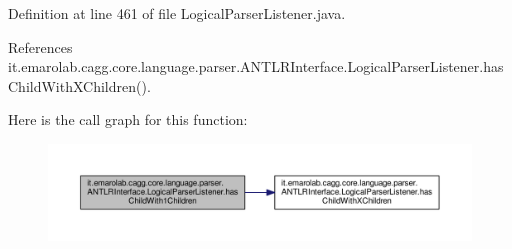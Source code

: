 Definition at line 461 of file Logical\-Parser\-Listener.\-java.



References it.\-emarolab.\-cagg.\-core.\-language.\-parser.\-A\-N\-T\-L\-R\-Interface.\-Logical\-Parser\-Listener.\-has\-Child\-With\-X\-Children().



Here is the call graph for this function\-:\nopagebreak
\begin{figure}[H]
\begin{center}
\leavevmode
\includegraphics[width=350pt]{classit_1_1emarolab_1_1cagg_1_1core_1_1language_1_1parser_1_1ANTLRInterface_1_1LogicalParserListener_a351f569f0bd9bbf0b611e3888a06c00d_cgraph}
\end{center}
\end{figure}


